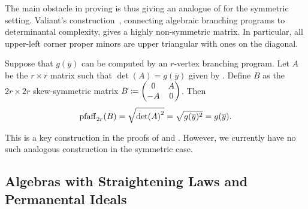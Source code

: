 \documentclass[letterpaper, 11pt]{amsart}
\newif\iffull
\begin{document}
The main obstacle in proving  is thus giving an analogue of  for the symmetric setting.
Valiant's construction~\cite{Val79}, connecting algebraic branching programs to determinantal complexity, gives a highly non-symmetric matrix.
In particular, all upper-left corner proper minors are upper triangular with ones on the diagonal.
\iffull
This is not an issue in the skew-symmetric case.

\iffull
\clearpage
\fi

\begin{rmk}\label{rmk:ABP_pfaff}
  Suppose that $g(\overline{y})$ can be computed by an $r$-vertex branching program.
  Let $A$ be the $r \times r$ matrix such that $\det(A) = g(\overline{y})$ given by .
  Define $B$ as the $2r \times 2r$ skew-symmetric matrix $B \coloneqq \begin{pmatrix} 0 & A \\ -A & 0 \end{pmatrix}$.
  Then
  \[
    \operatorname{pfaff}_{2r}(B) = \sqrt{\det(A)^2} = \sqrt{g(\overline{y})^2} = g(\overline{y}).
  \]
\end{rmk}
This is a key construction in the proofs of  and .
However, we currently have no such analogous construction in the symmetric case.
\fi

\subsection{Algebras with Straightening Laws and Permanental Ideals}
\end{document}
